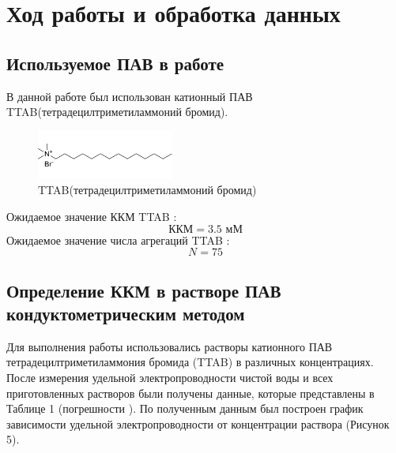 \documentclass[a4paper,12pt]{article}
\begin{document}
\section{Ход работы и обработка данных}
\subsection{Используемое ПАВ в работе}

В данной работе был использован катионный ПАВ TTAB(тетрадецилтриметиламмоний бромид).

\begin{figure}[h!]
    \centering
    \includegraphics[width = 0.4\textwidth]{55.png}
    \caption{TTAB(тетрадецилтриметиламмоний бромид)}
    \label{fig:no_int}
\end{figure}

Ожидаемое значение ККМ TTAB \cite{1}:
\begin{equation}
    {\text{ККМ}} = 3.5 {\text{ мМ}}
\end{equation}
Ожидаемое значение числа агрегаций TTAB \cite{1}: 
\begin{equation}
    N = 75
\end{equation}

\subsection{Определение ККМ в растворе ПАВ кондуктометрическим методом}
Для выполнения работы использовались растворы
катионного ПАВ тетрадецилтриметиламмония бромида (TTAB) в различных концентрациях. После измерения удельной электропроводности чистой воды и всех приготовленных растворов были получены данные, которые представлены в  Таблице 1 (погрешности ).   По полученным данным был построен график зависимости удельной электропроводности от концентрации раствора (Рисунок 5).
\end{document}
